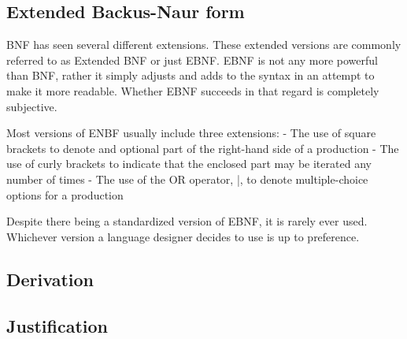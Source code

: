 
\subsection{Extended Backus-Naur form}

BNF has seen several different extensions.
These extended versions are commonly referred to as Extended BNF or just EBNF. 
EBNF is not any more powerful than BNF, rather it simply adjusts and adds to the syntax in an attempt to make it more readable.
Whether EBNF succeeds in that regard is completely subjective. 

Most versions of ENBF usually include three extensions:
- The use of square brackets to denote and optional part of the right-hand side of a production
- The use of curly brackets to indicate that the enclosed part may be iterated any number of times
- The use of the OR operator, |, to denote multiple-choice options for a production

Despite there being a standardized version of EBNF, it is rarely ever used. 
Whichever version a language designer decides to use is up to preference.

\subsection{Derivation}


\subsection{Justification}

